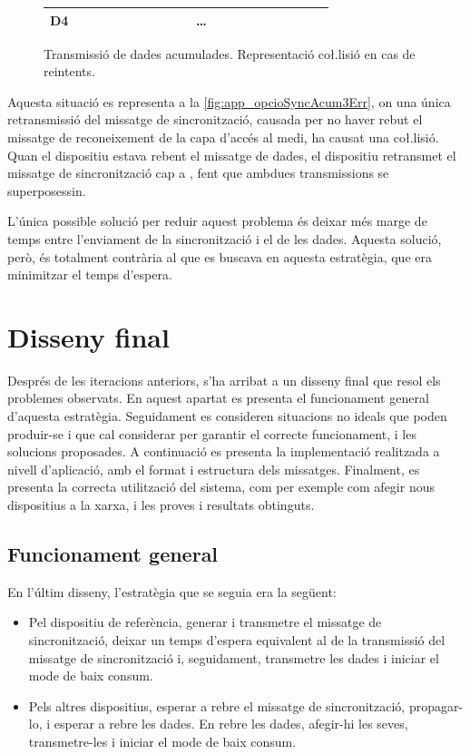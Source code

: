 \documentclass{tfgitic}[2024/07/01]
\begin{document}
{\begin{figure}[ht]
{\begin{tabular}{!{\vrule width \heavyrulewidth}c!{\vrule width \heavyrulewidth}ccccccccccc!{\vrule width \heavyrulewidth}}
{D4} & ~~~~~~~~~~~~~~ & & ~~~~~~~~~~~~~~\\

\toprule
\end{tabular}
}
    \caption{Transmissió de dades acumulades. Representació co\l.lisió en cas de reintents.}
    \label{fig:app_opcioSyncAcum3Err}
\end{figure}

Aquesta situació es representa a la \autoref{fig:app_opcioSyncAcum3Err}, on una única retransmissió del missatge de sincronització, causada per no haver rebut el missatge de reconeixement de la capa d'accés al medi, ha causat una co\l.lisió. Quan el dispositiu  estava rebent el missatge de dades, el dispositiu  retransmet el missatge de sincronització cap a , fent que ambdues transmissions se superposessin.

L'única possible solució per reduir aquest problema és deixar més marge de temps entre l'enviament de la sincronització i el de les dades. Aquesta solució, però, és totalment contrària al que es buscava en aquesta estratègia, que era minimitzar el temps d'espera.

\section{Disseny final}
Després de les iteracions anteriors, s'ha arribat a un disseny final que resol els problemes observats. En aquest apartat es presenta el funcionament general d'aquesta estratègia. Seguidament es consideren situacions no ideals que poden produir-se i que cal considerar per garantir el correcte funcionament, i les solucions proposades. A continuació es presenta la implementació realitzada a nivell d'aplicació, amb el format i estructura dels missatges. Finalment, es presenta la correcta utilització del sistema, com per exemple com afegir nous dispositius a la xarxa, i les proves i resultats obtinguts.

\subsection{Funcionament general}
En l'últim disseny, l'estratègia que se seguia era la següent:
\begin{itemize}
    \item Pel dispositiu de referència, generar i transmetre el missatge de sincronització, deixar un temps d'espera equivalent al de la transmissió del missatge de sincronització i, seguidament, transmetre les dades i iniciar el mode de baix consum.
    \item Pels altres dispositius, esperar a rebre el missatge de sincronització, propagar-lo, i esperar a rebre les dades. En rebre les dades, afegir-hi les seves, transmetre-les i iniciar el mode de baix consum.
\end{itemize}

}
\end{document}
